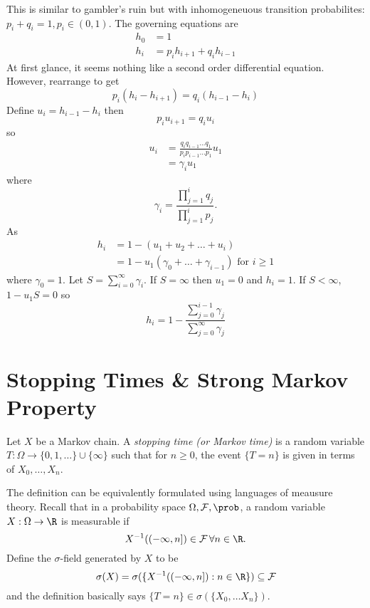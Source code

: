 \documentclass[a4paper]{article}
\begin{document}
\begin{eg}
  This is similar to gambler's ruin but with inhomogeneuous transition probabilites: \(p_i + q_i = 1, p_i \in (0, 1)\). The governing equations are
  \begin{align*}
    h_0 &= 1 \\
    h_i &= p_i h_{i+1} + q_i h_{i-1}
  \end{align*}
  At first glance, it seems nothing like a second order differential equation. However, rearrange to get
  \[
    p_i(h_i - h_{i + 1}) = q_i(h_{i - 1} -h_i)
  \]
  Define \(u_i = h_{i - 1} - h_i\) then
  \[
    p_i u_{i + 1} = q_i u_i
  \]
  so
  \begin{align*}
    u_i &= \frac{q_i q_{i - 1} \dots q_1}{p_i p_{i - 1} \dots p_1} u_1 \\
        &= \gamma_i u_1
  \end{align*}
  where
  \[
    \gamma_i = \frac{\prod_{j = 1}^{i} q_j}{\prod_{j = 1}^{i} p_j}.
  \]
  As
  \begin{align*}
    h_i &= 1 - (u_1 + u_2 + \dots + u_i) \\
        &= 1 - u_1(\gamma_0 + \dots + \gamma_{i - 1}) \text{ for } i \geq 1
  \end{align*}
  where \(\gamma_0 = 1\). Let \(S = \sum_{i = 0}^{\infty} \gamma_i \). If \(S = \infty\) then \(u_1 = 0\) and \(h_i = 1\). If \(S < \infty\), \(1 - u_1 S = 0\) so
  \[
    h_i = 1 - \frac{\sum_{j = 0}^{i - 1}\gamma_j}{\sum_{j = 0}^{\infty}\gamma_j}
  \]
\end{eg}

\section{Stopping Times \& Strong Markov Property}

\begin{definition}
  Let \(X\) be a Markov chain. A \emph{stopping time (or Markov time)} is a random variable \(T: \Omega \to \{0, 1, \dots\}\cup \{\infty\}\) such that for \(n \geq 0\), the event \(\{T = n\}\) is given in terms of \(X_0, \dots, X_n\).
\end{definition}

\begin{note}
  The definition can be equivalently formulated using languages of meausure theory. Recall that in a probability space \(\Omega, \mathcal F, \prob\), a random variable \(X: \Omega \to \R\) is measurable if
  \[
    X^{-1}((-\infty, n]) \in \mathcal F \, \forall n \in \R.
  \]
  Define the \(\sigma\)-field generated by \(X\) to be
  \[
    \sigma(X) = \sigma(\{X^{-1}((-\infty, n]): n \in \R \}) \subseteq \mathcal F
  \]
  and the definition basically says \(\{T = n \} \in \sigma(\{X_0, \dots X_n\})\).
\end{note}
\end{document}
